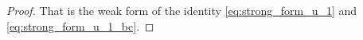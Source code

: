 \documentclass[10pt,a4paper]{amsart}
\newcommand{\di}[1]{\,\mathrm{d}#1}
\def\p{\partial}
\begin{document}
\begin{proof}
That is the weak form of the identity \eqref{eq:strong_form_u_1} and \eqref{eq:strong_form_u_1_bc}. 


\end{proof}
\end{document}
